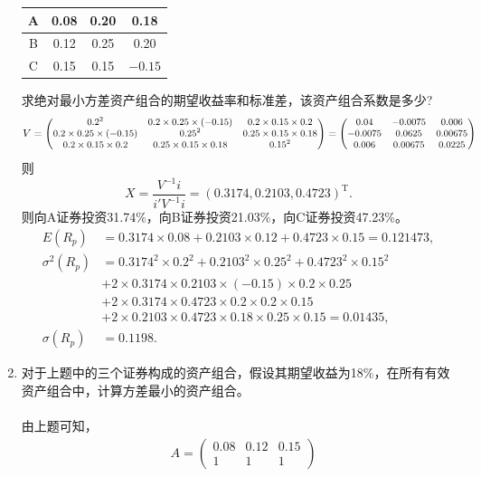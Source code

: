 \begin{enumerate}
\begin{center}
{\begin{tabular}{c|c|c|c}
            A & 0.08 & 0.20 & 0.18 \\ \hline
            B & 0.12 & 0.25 & 0.20 \\ \hline
            C & 0.15 & 0.15 & $-0.15$ \\ \hline
        \end{tabular}}
    \end{center}
    求绝对最小方差资产组合的期望收益率和标准差，该资产组合系数是多少?\\
    \sol
    \[{\small V = \begin{pmatrix}
        0.2^2 & 0.2 \times 0.25 \times (-0.15) & 0.2 \times 0.15 \times 0.2\\
        0.2 \times 0.25 \times (-0.15) & 0.25^2 & 0.25 \times 0.15 \times 0.18\\
        0.2 \times 0.15 \times 0.2 & 0.25 \times 0.15 \times 0.18 & 0.15^2
    \end{pmatrix}=\begin{pmatrix}
        0.04 & -0.0075 & 0.006 \\ -0.0075 & 0.0625 & 0.00675\\ 0.006 & 0.00675 & 0.0225
    \end{pmatrix}}\]
    则
    \[X=\frac{V^{-1}i}{i'V^{-1}i}=(0.3174,0.2103,0.4723)^{\mathrm{T}}.\]
    则向A证券投资31.74\%，向B证券投资21.03\%，向C证券投资47.23\%。
    \begin{align*}
        E(R_p) & = 0.3174 \times 0.08 + 0.2103 \times 0.12 + 0.4723 \times 0.15 = 0.121473,\\
        \sigma^2(R_p) & = 0.3174^2 \times 0.2^2 + 0.2103^2 \times 0.25^2 + 0.4723^2 \times 0.15^2\\
        & + 2 \times 0.3174 \times 0.2103 \times (-0.15) \times 0.2 \times 0.25\\
        & + 2 \times 0.3174 \times 0.4723 \times 0.2 \times 0.2 \times 0.15\\
        & + 2 \times 0.2103 \times 0.4723 \times 0.18 \times 0.25 \times 0.15 = 0.01435,\\
        \sigma(R_p) & = 0.1198.
    \end{align*}
    \item 对于上题中的三个证券构成的资产组合，假设其期望收益为18\%，在所有有效资产组合中，计算方差最小的资产组合。\\
    \sol\\
    由上题可知，
    \begin{align*}
        & A = \begin{pmatrix}
            0.08 & 0.12 & 0.15\\1 & 1 & 1

\end{pmatrix}
\end{align*}
\end{enumerate}
